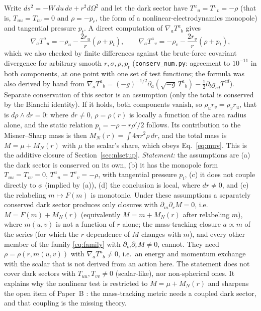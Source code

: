 \documentclass[11pt]{article}
\begin{document}
Write $ds^2=-W\,du\,dv+r^2d\Omega^2$ and let the dark sector have $T^u{}_u=T^v{}_v=-\rho$ (that is, $T_{uu}=T_{vv}=0$ and $\rho=-p_r$, the form of a nonlinear-electrodynamics monopole) and tangential pressure $p_t$. A direct computation of $\nabla_aT^a{}_b$ gives
\begin{equation}
\nabla_aT^a{}_u=-\rho_u-\frac{2r_u}{r}(\rho+p_t),\qquad \nabla_aT^a{}_v=-\rho_v-\frac{2r_v}{r}(\rho+p_t),\label{eq:consT}
\end{equation}
which we also checked by finite differences against the brute-force covariant divergence for arbitrary smooth $r,\sigma,\rho,p_t$ (\texttt{conserv\_num.py}: agreement to $10^{-11}$ in both components, at one point with one set of test functions; the formula was also derived by hand from $\nabla_aT^a{}_b=(-g)^{-1/2}\partial_a(\sqrt{-g}\,T^a{}_b)-\tfrac12\partial_bg_{cd}T^{cd}$). Separate conservation of this sector is an assumption (only the total is conserved by the Bianchi identity). If it holds, both components vanish, so $\rho_ur_v=\rho_vr_u$, that is $d\rho\wedge dr=0$: where $dr\ne0$, $\rho=\rho(r)$ is locally a function of the area radius alone, and the static relation $p_t=-\rho-r\rho'/2$ follows. Its contribution to the Misner--Sharp mass is then $M_N(r)=\int4\pi r^2\rho\,dr$, and the total mass is $M=\mu+M_N(r)$ with $\mu$ the scalar's share, which obeys Eq.~\eqref{eq:muv}. This is the additive closure of Section~\ref{sec:nlsetup}. \emph{Statement:} the assumptions are (a) the dark sector is conserved on its own, (b) it has the monopole form $T_{uu}=T_{vv}=0$, $T^u{}_u=T^v{}_v=-\rho$, with tangential pressure $p_t$, (c) it does not couple directly to $\phi$ (implied by (a)), (d) the conclusion is local, where $dr\neq0$, and (e) the relabeling $m\mapsto F(m)$ is monotonic. Under these assumptions a separately conserved dark sector produces only closures with $\partial_m\partial_rM=0$, i.e.\ $M=F(m)+M_N(r)$ (equivalently $M=m+M_N(r)$ after relabeling $m$), where $m(u,v)$ is not a function of $r$ alone; the mass-tracking closure $a\propto m$ of the series (for which the $r$-dependence of $M$ changes with $m$), and every other member of the family \eqref{eq:family} with $\partial_m\partial_rM\neq0$, cannot. They need $\rho=\rho(r,m(u,v))$ with $\nabla_aT^a{}_b\neq0$, i.e.\ an energy and momentum exchange with the scalar that is not derived from an action here. The statement does not cover dark sectors with $T_{uu},T_{vv}\ne0$ (scalar-like), nor non-spherical ones. It explains why the nonlinear test is restricted to $M=\mu+M_N(r)$ and sharpens the open item of Paper~B \citep{PaperB}: the mass-tracking metric needs a coupled dark sector, and that coupling is the missing theory.
\end{document}
